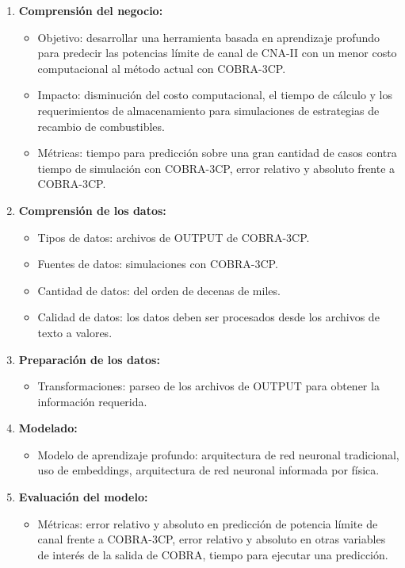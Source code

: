 \documentclass[
11pt, %
]{charter}
\begin{document}
\begin{enumerate}
  \item \textbf{Comprensión del negocio:}
    \begin{itemize}
      \item Objetivo: desarrollar una herramienta basada en aprendizaje profundo para predecir las potencias límite de canal de CNA-II con un menor costo computacional al método actual con COBRA-3CP.
      \item Impacto: disminución del costo computacional, el tiempo de cálculo y los requerimientos de almacenamiento para simulaciones de estrategias de recambio de combustibles.
      \item Métricas: tiempo para predicción sobre una gran cantidad de casos contra tiempo de simulación con COBRA-3CP, error relativo y absoluto frente a COBRA-3CP.
    \end{itemize}
  \item \textbf{Comprensión de los datos:}
    \begin{itemize}
      \item Tipos de datos: archivos de OUTPUT de COBRA-3CP.
      \item Fuentes de datos: simulaciones con COBRA-3CP.
      \item Cantidad de datos: del orden de decenas de miles.
      \item Calidad de datos: los datos deben ser procesados desde los archivos de texto a valores.
    \end{itemize}
  \item \textbf{Preparación de los datos:}
    \begin{itemize}
      \item Transformaciones: parseo de los archivos de OUTPUT para obtener la información requerida.
    \end{itemize}
  \item \textbf{Modelado:}
    \begin{itemize}
        \item Modelo de aprendizaje profundo: arquitectura de red neuronal tradicional, uso de embeddings, arquitectura de red neuronal informada por física.
    \end{itemize}
  \item \textbf{Evaluación del modelo:}
    \begin{itemize}
        \item Métricas: error relativo y absoluto en predicción de potencia límite de canal frente a COBRA-3CP, error relativo y absoluto en otras variables de interés de la salida de COBRA, tiempo para ejecutar una predicción.
    \end{itemize}
\end{enumerate}
\end{document}
